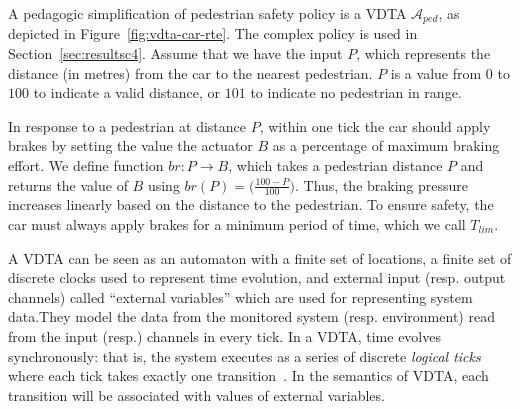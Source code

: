 \begin{example}
	\label{eg:vdta}
	
	A pedagogic simplification of pedestrian safety policy is a \ac{VDTA} $\mathcal{A}_{ped}$, as
        depicted in Figure~\ref{fig:vdta-car-rte}.
        The complex policy is used in Section~\ref{sec:resultsc4}.
	Assume that we have the input $P$, which represents the distance (in metres) from the car to the nearest pedestrian.
	$P$ is a value from $0$ to $100$ to indicate a valid distance, or $101$ to indicate no pedestrian in range.
	
	In response to a pedestrian at distance $P$, within one tick
        the car should apply brakes by setting the value the actuator
        $B$ as a percentage of maximum braking effort.
	We define function $br: P \rightarrow B$, which takes a
        pedestrian distance $P$ and returns the value of $B$ using $br\left(P\right) = \big(\frac{100 - P}{100}\big)$. 
	Thus, the braking pressure increases linearly based on the distance to the pedestrian. To ensure safety, the car must always apply brakes for a minimum period of time, which we call $T_{lim}$.
	
	
	
\end{example}

A VDTA can be seen as an automaton with a finite set of locations, a
finite set of discrete clocks used to represent time evolution, and
external input (resp. output channels) called ``external variables''
which are used for representing system data.They model the data from
the monitored system (resp. environment) read from the input (resp.)
channels in every tick. 
In a \ac{VDTA}, time evolves synchronously: that is, the system executes as a series of discrete \emph{logical ticks} where each tick takes exactly one transition~\cite{benveniste2003synchronous}.
In the semantics of VDTA, each transition will be associated with values of external variables.

